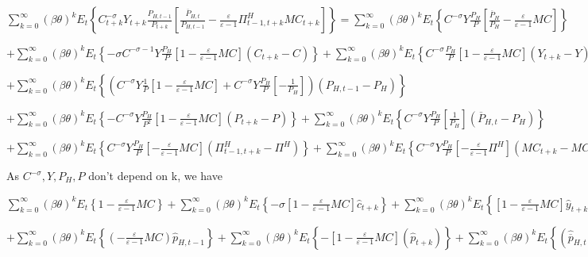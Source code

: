 \documentclass[
]{article}
\begin{document}
\(\displaystyle \sum_{k=0}^\infty (\beta \theta)^kE_t \left\{ C_{t+k}^{-\sigma} Y_{t+k } \frac{P_{H,t-1}}{P_{t+k}} \left[ \frac{\overline{P}_{H,t}}{P_{H,t-1}}-\frac{\varepsilon}{\varepsilon-1}\Pi_{t-1,t+k}^H MC_{t+k}\right] \right\} = \sum_{k=0}^\infty (\beta \theta)^kE_t \left\{ C^{-\sigma} Y \frac{P_{H}}{P} \left[ \frac{\overline{P}_{H}}{P_{H}}-\frac{\varepsilon}{\varepsilon-1} MC \right] \right\}\)

\(\displaystyle + \sum_{k=0}^\infty (\beta \theta)^kE_t \left\{ -\sigma C^{-\sigma-1} Y \frac{P_{H}}{P} \left[ 1-\frac{\varepsilon}{\varepsilon-1} MC \right](C_{t+k}-C) \right\} + \sum_{k=0}^\infty (\beta \theta)^kE_t \left\{ C^{-\sigma} \frac{P_{H}}{P} \left[ 1-\frac{\varepsilon}{\varepsilon-1} MC \right](Y_{t+k}-Y) \right\}\)

\(\displaystyle + \sum_{k=0}^\infty (\beta \theta)^kE_t \left\{ \left( C^{-\sigma} Y \frac{1}{P} \left[ 1-\frac{\varepsilon}{\varepsilon-1} MC \right] + C^{-\sigma}Y \frac{P_H}{P} \left[ -\frac{1}{P_H} \right] \right)(P_{H,t-1}-P_H) \right\}\)

\(\displaystyle + \sum_{k=0}^\infty (\beta \theta)^kE_t \left\{ -C^{-\sigma} Y \frac{P_{H}}{P^2} \left[ 1-\frac{\varepsilon}{\varepsilon-1} MC \right](P_{t+k}-P) \right\} + \sum_{k=0}^\infty (\beta \theta)^kE_t \left\{ C^{-\sigma} Y \frac{P_{H}}{P} \left[ \frac{1}{P_H} \right](\overline{P}_{H,t}-P_H) \right\}\)

\(\displaystyle + \sum_{k=0}^\infty (\beta \theta)^kE_t \left\{ C^{-\sigma} Y \frac{P_{H}}{P} \left[ -\frac{\varepsilon}{\varepsilon-1} MC \right](\Pi_{t-1,t+k}^H-\Pi^H) \right\} + \sum_{k=0}^\infty (\beta \theta)^kE_t \left\{ C^{-\sigma} Y \frac{P_{H}}{P} \left[ -\frac{\varepsilon}{\varepsilon-1} \Pi^H \right](MC_{t+k}-MC) \right\}=0\)

As \(C^{-\sigma}, Y, P_H, P\) don't depend on k, we have

\(\displaystyle \sum_{k=0}^\infty (\beta \theta)^kE_t \left\{ 1-\frac{\varepsilon}{\varepsilon-1} MC \right\} + \sum_{k=0}^\infty (\beta \theta)^kE_t \left\{ -\sigma \left[ 1-\frac{\varepsilon}{\varepsilon-1} MC \right]\hat{c}_{t+k} \right\} + \sum_{k=0}^\infty (\beta \theta)^kE_t \left\{ \left[ 1-\frac{\varepsilon}{\varepsilon-1} MC \right]\hat{y}_{t+k} \right\}\)

\(\displaystyle + \sum_{k=0}^\infty (\beta \theta)^kE_t \left\{ \left(-\frac{\varepsilon}{\varepsilon-1} MC \right)\hat{p}_{H,t-1} \right\} + \sum_{k=0}^\infty (\beta \theta)^kE_t \left\{ - \left[ 1-\frac{\varepsilon}{\varepsilon-1} MC \right](\hat{p}_{t+k}) \right\} + \sum_{k=0}^\infty (\beta \theta)^kE_t \left\{ (\hat{\overline{p}}_{H,t}) \right\}\)
\end{document}
